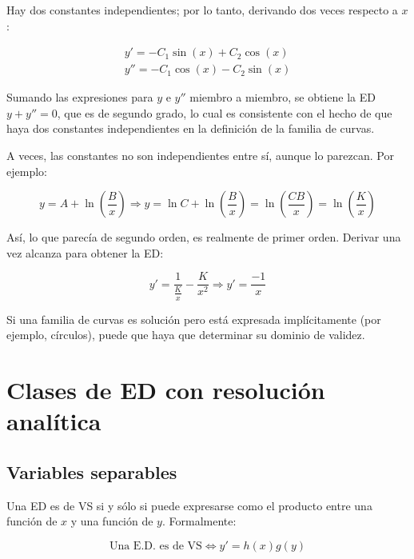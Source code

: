 \documentclass{article}
\begin{document}
Hay dos constantes independientes; por lo tanto, derivando dos veces respecto a $x$:

\begin{subequations}
\begin{align}
y' = -C_1 \sin(x) + C_2 \cos(x) \\
y'' = -C_1 \cos(x) - C_2 \sin(x)
\end{align}
\end{subequations}

Sumando las expresiones para $y$ e $y''$ miembro a miembro, se obtiene la ED $y + y'' = 0$, que es de segundo grado, lo cual es consistente con el hecho de que haya dos constantes independientes en la definición de la familia de curvas.

A veces, las constantes no son independientes entre sí, aunque lo parezcan. Por ejemplo:

\begin{equation}
y = A + \ln \left( \frac{B}{x} \right) \Rightarrow y = \ln C + \ln \left( \frac{B}{x} \right) = \ln \left( \frac{C B}{x} \right) = \ln \left( \frac{K}{x} \right)
\end{equation}

Así, lo que parecía de segundo orden, es realmente de primer orden. Derivar una vez alcanza para obtener la ED:

\begin{equation}
y' = \frac{1}{\frac{K}{x}} -\frac{K}{x^2} \Rightarrow y' = \frac{-1}{x}
\end{equation}

Si una familia de curvas es solución pero está expresada implícitamente (por ejemplo, círculos), puede que haya que determinar su dominio de validez.

\section{Clases de ED con resolución analítica}

\subsection{Variables separables}

Una ED es de VS si y sólo si puede expresarse como el producto entre una función de $x$ y una función de $y$. Formalmente:

\begin{equation}
\text{Una E.D. es de VS} \Leftrightarrow y' = h(x) g(y)
\end{equation}
\end{document}
